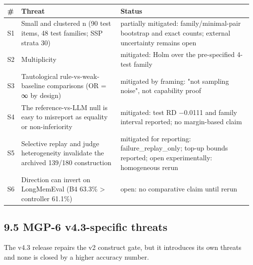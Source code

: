 {\def\LTcaptype{none} %
\begin{longtable}[]{@{}
  >{\raggedright\arraybackslash}p{}
  >{\raggedright\arraybackslash}p{}
  >{\raggedright\arraybackslash}p{}@{}}
\toprule\noalign{}
\begin{minipage}[b]{\linewidth}\raggedright
\textbf{\#}
\end{minipage} & \begin{minipage}[b]{\linewidth}\centering
\textbf{Threat}
\end{minipage} & \begin{minipage}[b]{\linewidth}\centering
\textbf{Status}
\end{minipage} \\
\midrule\noalign{}
\endhead
\bottomrule\noalign{}
\endlastfoot
S1 & Small and clustered n (90 test items, 48 test families; SSP strata
30) & partially mitigated: family/minimal-pair bootstrap and exact
counts; external uncertainty remains open \\
S2 & Multiplicity & mitigated: Holm over the pre-specified 4-test
family \\
S3 & Tautological rule-vs-weak-baseline comparisons (OR = ∞ by design) &
mitigated by framing: "not sampling noise", not capability proof \\
S4 & The reference-vs-LLM null is easy to misreport as equality or
non-inferiority & mitigated: test RD −0.0111 and family interval
reported; no margin-based claim \\
S5 & Selective replay and judge heterogeneity invalidate the archived
139/180 construction & mitigated for reporting: failure\_replay\_only;
top-up bounds reported; open experimentally: homogeneous rerun \\
S6 & Direction can invert on LongMemEval (B4 63.3\% \textgreater{}
controller 61.1\%) & open: no comparative claim until rerun \\
\end{longtable}
}

\subsection{9.5 MGP-6 v4.3-specific
threats}\label{mgp-6-v4.3-specific-threats}

The v4.3 release repairs the v2 construct gate, but it introduces its
own threats and none is closed by a higher accuracy number.

